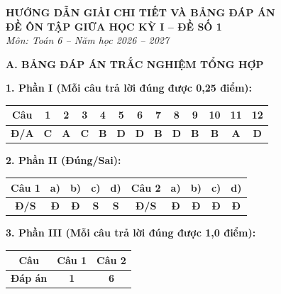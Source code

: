 \documentclass[12pt,a4paper]{article}
\begin{document}
\begin{center}
  \textbf{\Large HƯỚNG DẪN GIẢI CHI TIẾT VÀ BẢNG ĐÁP ÁN}\\
  \textbf{\large ĐỀ ÔN TẬP GIỮA HỌC KỲ I -- ĐỀ SỐ 1}\\
  \textit{Môn: Toán 6 -- Năm học 2026 -- 2027}
\end{center}
\vspace{2mm}

\noindent\textbf{\large A. BẢNG ĐÁP ÁN TRẮC NGHIỆM TỔNG HỢP}
\vspace{1.5mm}

\noindent\textbf{1. Phần I (Mỗi câu trả lời đúng được 0,25 điểm):}
\begin{center}
\begin{tabular}{|c|c|c|c|c|c|c|c|c|c|c|c|c|}
\hline
\textbf{Câu} & \textbf{1} & \textbf{2} & \textbf{3} & \textbf{4} & \textbf{5} & \textbf{6} & \textbf{7} & \textbf{8} & \textbf{9} & \textbf{10} & \textbf{11} & \textbf{12} \\
\hline
\textbf{Đ/A} & \textbf{C} & \textbf{A} & \textbf{C} & \textbf{B} & \textbf{D} & \textbf{D} & \textbf{B} & \textbf{D} & \textbf{B} & \textbf{B} & \textbf{A} & \textbf{D} \\
\hline
\end{tabular}
\end{center}
\vspace{1mm}

\noindent\textbf{2. Phần II (Đúng/Sai):}
\begin{center}
\begin{tabular}{|c|c|c|c|c||c|c|c|c|c|}
\hline
\textbf{Câu 1} & \textbf{a)} & \textbf{b)} & \textbf{c)} & \textbf{d)} & \textbf{Câu 2} & \textbf{a)} & \textbf{b)} & \textbf{c)} & \textbf{d)} \\
\hline
\textbf{Đ/S} & \textbf{Đ} & \textbf{Đ} & \textbf{S} & \textbf{S} & \textbf{Đ/S} & \textbf{Đ} & \textbf{Đ} & \textbf{Đ} & \textbf{Đ} \\
\hline
\end{tabular}
\end{center}
\vspace{1mm}

\noindent\textbf{3. Phần III (Mỗi câu trả lời đúng được 1,0 điểm):}
\begin{center}
\begin{tabular}{|c|c|c|}
\hline
\textbf{Câu} & \textbf{Câu 1} & \textbf{Câu 2} \\
\hline
\textbf{Đáp án} & \textbf{1} & \textbf{6} \\
\hline
\end{tabular}
\end{center}
\vspace{3mm}
\end{document}

